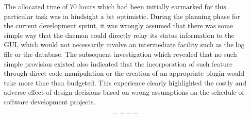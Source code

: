 \documentclass{article}
\begin{document}
The allocated time of 70 hours which had been initially earmarked for this particular task was in hindsight a bit optimistic. During the planning phase for the current development sprint, it was wrongly assumed that there was some simple way that the daemon could directly relay its status information to the GUI, which would not necessarily involve an intermediate facility such as the log file or the database. The subsequent investigation which revealed that no such simple provision existed also indicated that the incorporation of such feature through direct code manipulation or the creation of an appropriate plugin would take more time than budgeted. This experience clearly highlighted the costly and adverse effect of design decisions based on wrong assumptions on the schedule of software development projects.

\[----\]
\end{document}
